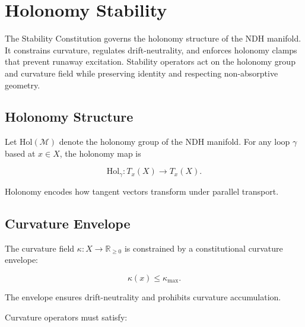 
\section{Holonomy Stability}
\label{sec:holonomy-stability}

The Stability Constitution governs the holonomy structure of the NDH
manifold. It constrains curvature, regulates drift-neutrality, and enforces
holonomy clamps that prevent runaway excitation. Stability operators act on
the holonomy group and curvature field while preserving identity and
respecting non-absorptive geometry.


\subsection{Holonomy Structure}

Let $\mathrm{Hol}(\mathcal{M})$ denote the holonomy group of the NDH
manifold. For any loop $\gamma$ based at $x \in X$, the holonomy map is

\[
\mathrm{Hol}_\gamma : T_x(X) \to T_x(X).
\]

Holonomy encodes how tangent vectors transform under parallel transport.


\subsection{Curvature Envelope}

The curvature field $\kappa : X \to \mathbb{R}_{\ge 0}$ is constrained by a
constitutional curvature envelope:

\[
\kappa(x) \le \kappa_{\max}.
\]

The envelope ensures drift-neutrality and prohibits curvature accumulation.

Curvature operators must satisfy:

